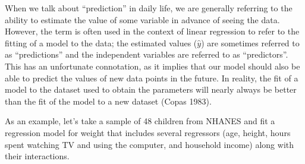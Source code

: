 \documentclass[]{book}
\theoremstyle{definition}
\theoremstyle{definition}
\theoremstyle{definition}
\theoremstyle{remark}
\begin{document}
When we talk about ``prediction'' in daily life, we are generally
referring to the ability to estimate the value of some variable in
advance of seeing the data. However, the term is often used in the
context of linear regression to refer to the fitting of a model to the
data; the estimated values (\(\hat{y}\)) are sometimes referred to as
``predictions'' and the independent variables are referred to as
``predictors''. This has an unfortunate connotation, as it implies that
our model should also be able to predict the values of new data points
in the future. In reality, the fit of a model to the dataset used to
obtain the parameters will nearly always be better than the fit of the
model to a new dataset (Copas 1983).

As an example, let's take a sample of 48 children from NHANES and fit a
regression model for weight that includes several regressors (age,
height, hours spent watching TV and using the computer, and household
income) along with their interactions.
\end{document}
